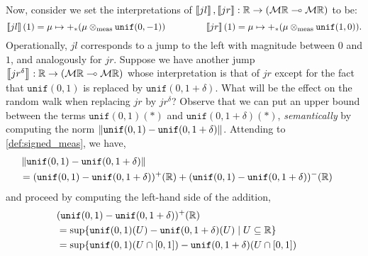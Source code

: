 \begin{example}
Now, consider we set the interpretations of $\left \llbracket jl \right \rrbracket, \left \llbracket jr \right \rrbracket: \mathbb{R} \to ( \mathcal{M}\mathbb{R} \multimap  \mathcal{M}\mathbb{R})$ to be:
\[
                        \left \llbracket jl \right \rrbracket(1)= \mu \mapsto +_\ast(\mu \otimes_{\text{meas}} \mathtt{unif}(0,-1))
                        \hspace{1.5cm}
                        \left \llbracket jr \right \rrbracket(1) =\mu \mapsto +_\ast(\mu \otimes_{\text{meas}} \mathtt{unif}(1,0)).
        \]
Operationally, $jl$ corresponds to a jump to the left with magnitude between $0$ and $1$, and analogously for $jr$.
Suppose we have another jump $\left \llbracket jr^{\delta} \right \rrbracket : \mathbb{R} \to ( \mathcal{M}\mathbb{R} \multimap  \mathcal{M}\mathbb{R})$ whose interpretation is that of $jr$ except for the 
fact that $\mathtt{unif}(0,1)$ is replaced by $\mathtt{unif}(0,1+\delta)$.
What will be the effect on the random walk when replacing $jr$ by $jr^{\delta}$?
Observe that we can put an upper bound between the terms $\mathtt{unif}(0,1)(\ast)$ and $\mathtt{unif}(0,1+\delta)(\ast)$, \emph{semantically} by computing the norm $\left\lVert \mathtt{unif}(0,1) - \mathtt{unif}(0,1+\delta)  \right\rVert$.  Attending to \autoref{def:signed_meas}, we have,
        \begin{align*}
        &\hspace{-15pt} \norm{ \mathtt{unif}(0,1) - \mathtt{unif}(0,1+\delta) }
        \\
        & \hspace{-15pt} =
        (\mathtt{unif}(0,1) - \mathtt{unif}(0,1+\delta))^+ (\Reals)
        +
        (\mathtt{unif}(0,1) - \mathtt{unif}(0,1+\delta))^- (\Reals)
        \end{align*}
        and proceed by computing the left-hand side of the addition,
        \begin{align*} 
        & \hspace{-15pt}(\mathtt{unif}(0,1) - \mathtt{unif}(0,1+\delta))^+ (\Reals)
        \\
        & \hspace{-15pt} = 
        \sup \{ \mathtt{unif}(0,1)(U) - \mathtt{unif}(0,1 + \delta)(U)
        \mid U \subseteq \Reals \}
        \\
        & \hspace{-15pt}
        =
        \sup \{ \mathtt{unif}(0,1)(U \cap [0,1]) 
        - \mathtt{unif}(0,1 + \delta)(U \cap [0,1]) \\

\end{align*}
\end{example}
